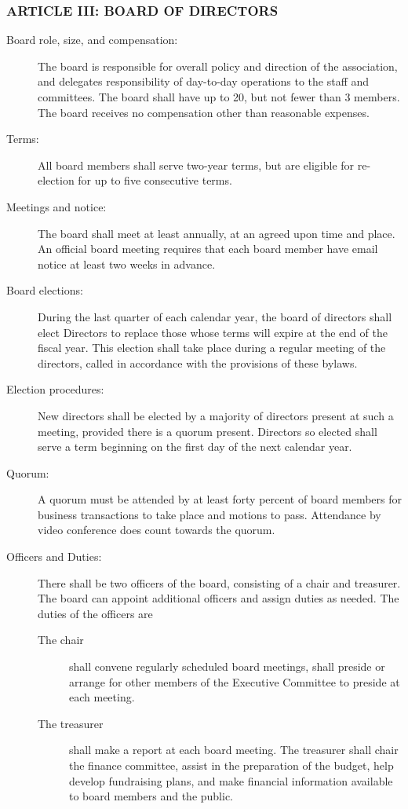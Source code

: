\documentclass[12pt]{article}
\begin{document}
\subsubsection*{ARTICLE III: BOARD OF DIRECTORS}
\begin{description}
\item[Board role, size, and compensation:] The board is responsible
for overall policy and direction of the association, and delegates
responsibility of day-to-day operations to the staff and
committees. The board shall have up to 20, but not fewer than 3
members. The board receives no compensation other than reasonable
expenses.

\item[Terms:] All board members shall serve two-year terms, but are
eligible for re-election for up to five consecutive terms.

\item[Meetings and notice:] The board shall meet at least annually, at an
agreed upon time and place. An official board meeting requires that
each board member have email notice at least two weeks in advance.

\item[Board elections:] During the last quarter of each calendar year, the
board of directors shall elect Directors to replace those whose terms
will expire at the end of the fiscal year. This election shall take
place during a regular meeting of the directors, called in accordance
with the provisions of these bylaws.

\item[Election procedures:] New directors shall be elected by a majority
of directors present at such a meeting, provided there is a quorum
present. Directors so elected shall serve a term beginning on the first
day of the next calendar year.

\item[Quorum:] A quorum must be attended by at least forty percent of
board members for business transactions to take place and motions to
pass. Attendance by video conference does count towards the quorum.

\item[Officers and Duties:] There shall be two officers of the board,
  consisting of a chair and treasurer. The board can appoint additional officers and
assign duties as needed. The duties of the officers are

\begin{description}
\item[The chair] shall convene regularly scheduled board meetings,
  shall preside or arrange for other members of the Executive
  Committee to preside at each meeting.
\item[The treasurer] shall make a report at each board meeting. The
  treasurer shall chair the finance committee, assist in the
  preparation of the budget, help develop fundraising plans, and make
  financial information available to board members and the public.
\end{description}


\end{description}
\end{document}
